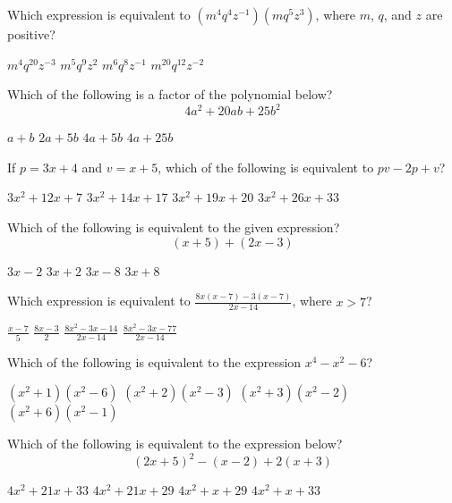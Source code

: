 \question[1]
Which expression is equivalent to $\left(m^{4} q^{4} z^{-1}\right)\left(m q^{5} z^{3}\right)$, where $m$, $q$, and $z$ are positive?
\begin{choices}
  \choice $m^{4} q^{20} z^{-3}$
  \CorrectChoice $m^{5} q^{9} z^{2}$
  \choice $m^{6} q^{8} z^{-1}$
  \choice $m^{20} q^{12} z^{-2}$
\end{choices}

\question[1]
Which of the following is a factor of the polynomial below?
\[
  4 a^{2}+20 a b+25 b^{2}
\]
\begin{choices}
  \choice $a+b$
  \CorrectChoice $2 a+5 b$
  \choice $4 a+5 b$
  \choice $4 a+25 b$
\end{choices}



\newpage



\question[1]
If $p=3 x+4$ and $v=x+5$, which of the following is equivalent to $p v-2 p+v$?
\begin{choices}
  \choice $3 x^{2}+12 x+7$
  \CorrectChoice $3 x^{2}+14 x+17$
  \choice $3 x^{2}+19 x+20$
  \choice $3 x^{2}+26 x+33$
\end{choices}

\question[1]
Which of the following is equivalent to the given expression?
\[
  (x+5)+(2 x-3)
\]
\begin{choices}
  \choice $3 x-2$
  \CorrectChoice $3 x+2$
  \choice $3 x-8$
  \choice $3 x+8$
\end{choices}

\question[1]
Which expression is equivalent to $\frac{8 x(x-7)-3(x-7)}{2 x-14}$, where $x>7$?
\begin{choices}
  \choice $\frac{x-7}{5}$
  \CorrectChoice $\frac{8 x-3}{2}$
  \choice $\frac{8 x^{2}-3 x-14}{2 x-14}$
  \choice $\frac{8 x^{2}-3 x-77}{2 x-14}$
\end{choices}

\question[1]
Which of the following is equivalent to the expression $x^{4}-x^{2}-6$?
\begin{choices}
  \choice $\left(x^{2}+1\right)\left(x^{2}-6\right)$
  \CorrectChoice $\left(x^{2}+2\right)\left(x^{2}-3\right)$
  \choice $\left(x^{2}+3\right)\left(x^{2}-2\right)$
  \choice $\left(x^{2}+6\right)\left(x^{2}-1\right)$
\end{choices}

\question[1]
Which of the following is equivalent to the expression below?
\[
  (2 x+5)^{2}-(x-2)+2(x+3)
\]
\begin{choices}
  \CorrectChoice $4 x^{2}+21 x+33$
  \choice $4 x^{2}+21 x+29$
  \choice $4 x^{2}+x+29$
  \choice $4 x^{2}+x+33$
\end{choices}




